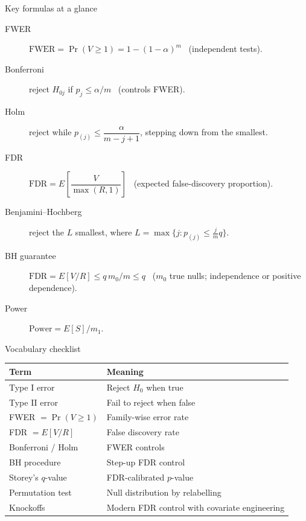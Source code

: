 \documentclass[aspectratio=169,11pt]{beamer}
\begin{document}
\begin{frame}{Key formulas at a glance}
  \footnotesize
  \begin{description}
    \item[FWER] $\mathrm{FWER}=\Pr(V\ge 1)=1-(1-\alpha)^m$ \ (independent tests).
    \item[Bonferroni] reject $H_{0j}$ if $p_j\le \alpha/m$ \ (controls FWER).
    \item[Holm] reject while $p_{(j)}\le \dfrac{\alpha}{m-j+1}$, stepping down from the smallest.
    \item[FDR] $\mathrm{FDR}=E\!\left[\dfrac{V}{\max(R,1)}\right]$ \ (expected false-discovery proportion).
    \item[Benjamini--Hochberg] reject the $L$ smallest, where $L=\max\{j: p_{(j)}\le \tfrac{j}{m}q\}$.
    \item[BH guarantee] $\mathrm{FDR}=E[V/R]\le q\,m_0/m\le q$ \ ($m_0$ true nulls; independence or positive dependence).
    \item[Power] $\mathrm{Power}=E[S]/m_1$.
  \end{description}
\end{frame}

\begin{frame}{Vocabulary checklist}
  \footnotesize
  \begin{tabular}{ll}
    \toprule
    \textbf{Term} & \textbf{Meaning} \\
    \midrule
    Type I error & Reject $H_0$ when true \\
    Type II error & Fail to reject when false \\
    FWER $= \Pr(V \ge 1)$ & Family-wise error rate \\
    FDR $= E[V/R]$ & False discovery rate \\
    Bonferroni / Holm & FWER controls \\
    BH procedure & Step-up FDR control \\
    Storey's $q$-value & FDR-calibrated $p$-value \\
    Permutation test & Null distribution by relabelling \\
    Knockoffs & Modern FDR control with covariate engineering \\
    \bottomrule
  \end{tabular}
\end{frame}
\end{document}

